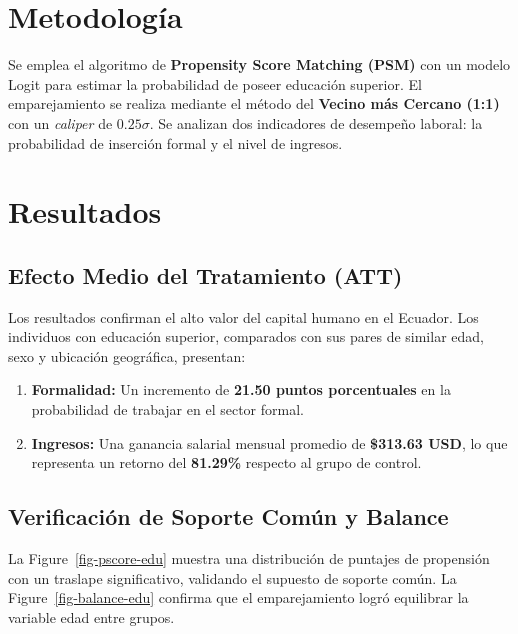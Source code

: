 \documentclass[12pt,spanish]{article}
\providecommand{\tightlist}{%
  \setlength{\itemsep}{0pt}\setlength{\parskip}{0pt}}
\begin{document}
\section{Metodología}\label{metodologuxeda}

Se emplea el algoritmo de \textbf{Propensity Score Matching (PSM)} con
un modelo Logit para estimar la probabilidad de poseer educación
superior. El emparejamiento se realiza mediante el método del
\textbf{Vecino más Cercano (1:1)} con un \emph{caliper} de
\(0.25\sigma\). Se analizan dos indicadores de desempeño laboral: la
probabilidad de inserción formal y el nivel de ingresos.

\section{Resultados}\label{resultados}

\subsection{Efecto Medio del Tratamiento
(ATT)}\label{efecto-medio-del-tratamiento-att}

Los resultados confirman el alto valor del capital humano en el Ecuador.
Los individuos con educación superior, comparados con sus pares de
similar edad, sexo y ubicación geográfica, presentan:

\begin{enumerate}
\def\labelenumi{\arabic{enumi}.}
\tightlist
\item
  \textbf{Formalidad:} Un incremento de \textbf{21.50 puntos
  porcentuales} en la probabilidad de trabajar en el sector formal.
\item
  \textbf{Ingresos:} Una ganancia salarial mensual promedio de
  \textbf{\$313.63 USD}, lo que representa un retorno del
  \textbf{81.29\%} respecto al grupo de control.
\end{enumerate}

\subsection{Verificación de Soporte Común y
Balance}\label{verificaciuxf3n-de-soporte-comuxfan-y-balance}

La Figure~\ref{fig-pscore-edu} muestra una distribución de puntajes de
propensión con un traslape significativo, validando el supuesto de
soporte común. La Figure~\ref{fig-balance-edu} confirma que el
emparejamiento logró equilibrar la variable edad entre grupos.
\end{document}
